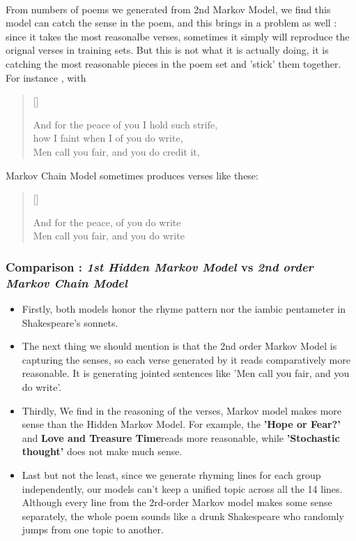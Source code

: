 \paragraph{}
From numbers of poems we generated from 2nd Markov Model, we find this model can catch the sense in the poem, and this brings in a problem as well : since it takes the  most reasonalbe verses, sometimes it simply will reproduce the orignal verses in training sets. But this is not what it is actually doing, it is catching the most reasonable pieces in the poem set and 'stick' them together. For instance , with 
\settowidth{\versewidth}{even  see  shall  accessary  used  must  find  and  herself  enfeebled  mine  it}
\begin{verse}[\versewidth]

{\color{blue}And for the peace} of you I hold such strife,\\
how I faint when I of {\color{red}you do write},\\
{\color{blue}Men call you fair}, and you do credit it,\\

\end{verse}
Markov Chain Model sometimes produces verses like these:
\settowidth{\versewidth}{even  see  shall  accessary  used  must  find  and  herself  enfeebled  mine  it}
\begin{verse}[\versewidth]

{\color{blue}And for the peace}, of {\color{red}you do write}\\
{\color{blue}Men call you fair}, and {\color{red}you do write}\\

\end{verse}
\subsubsection{Comparison : \textit{1st Hidden Markov Model} vs \textit{2nd order Markov Chain Model}}
\vspace{3pt}
\begin{itemize}
	\item Firstly, both models honor the rhyme pattern nor the iambic pentameter in Shakespeare's sonnets.
	\item The next thing we should mention is that the 2nd order Markov Model is capturing the senses, so each verse generated by it reads comparatively more reasonable. It is generating jointed sentences like '{\color{blue}Men call you fair}, and {\color{red}you do write}'.
	\item Thirdly, We find in the reasoning of the verses, Markov model makes more sense than the Hidden Markov Model. For example, the \textbf{'Hope or Fear?'} and \textbf{Love and Treasure Time}reads more reasonable, while \textbf{'Stochastic thought'} does not make much sense. 
	\item Last but not the least, since we generate rhyming lines for each group independently, our models can't keep a unified topic across all the 14 lines. Although every line from the 2rd-order Markov model makes some sense separately, the whole poem sounds like a drunk Shakespeare who randomly jumps from one topic to another.
\end{itemize}